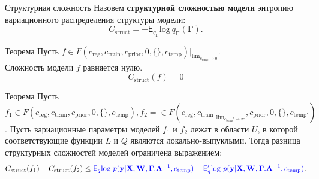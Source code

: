\documentclass[usenames,dvipsnames,11pt,pdf,utf8,russian,aspectratio=169]{beamer}
\begin{document}
\begin{frame}{Структурная сложность}
\footnotesize
Назовем \textbf{структурной сложностью модели} энтропию вариационного распределения структуры модели:
\[
    C_\text{struct} = -\mathsf{E}_{q_{\boldsymbol{\Gamma}}} \text{log}~q_{\boldsymbol{\Gamma}}(\boldsymbol{\Gamma}).
\]
\begin{block}{Теорема}
Пусть $f \in F(c_{\text{reg}}, c_{\text{train}},  c_{\text{prior}}, 0, \{\},  c_{\text{temp}} )|_{\lim_{c_{\text{temp}} \to 0}} $.\\
Сложность модели $f$ равняется нулю.
\[
    C_\text{struct}(f) = 0
\]
\end{block}

\begin{block}{Теорема}
Пусть $f_1 \in F(c_{\text{reg}}, c_{\text{train}},  c_{\text{prior}}, 0, \{\},  c_{\text{temp}}), f_2 =  \in F(c_{\text{reg}}, c_{\text{train}}|_{\lim_{c_{\text{temp}}' \to \infty}} ,  c_{\text{prior}}, 0, \{\},  c_{\text{temp}'})$.
Пусть вариационные параметры моделей $f_1$ и $f_2$ лежат в области $U$, в которой соответствующие функции $L$ и $Q$ являются локально-выпуклыми. 
Тогда разница структурных сложностей моделей ограничена выражением:
\[
    C_\text{struct}(f_1)  - C_\text{struct}(f_2) \leq \textcolor{blue}{\mathsf{E}_q \text{log}~{p(\mathbf{y} | \mathbf{X}, \mathbf{W}, \boldsymbol{\Gamma}. \mathbf{A}^{-1}, c_{\text{temp}})}} - \textcolor{blue}{\mathsf{E}_q' \text{log}~{p(\mathbf{y} | \mathbf{X}, \mathbf{W}, \boldsymbol{\Gamma}. \mathbf{A}^{-1}, c_{\text{temp}})}}.
\]
\end{block}

\end{frame}
\end{document}
